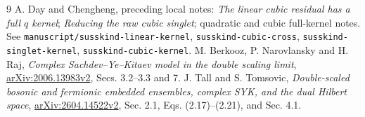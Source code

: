 \documentclass[11pt,a4paper]{article}
\begin{document}
\begin{thebibliography}{9}
 A. Day and Chengheng, preceding local notes:
\emph{The linear cubic residual has a full $q$ kernel};
\emph{Reducing the raw cubic singlet}; quadratic and cubic full-kernel
notes. See \texttt{manuscript/susskind-linear-kernel},
\texttt{susskind-cubic-cross}, \texttt{susskind-singlet-kernel},
\texttt{susskind-cubic-kernel}.
 M. Berkooz, P. Narovlansky and H. Raj,
\emph{Complex Sachdev--Ye--Kitaev model in the double scaling limit},
\href{https://arxiv.org/html/2006.13983v2}{arXiv:2006.13983v2},
Secs. 3.2--3.3 and 7.
 J. Tall and S. Tomsovic,
\emph{Double-scaled bosonic and fermionic embedded ensembles,
complex SYK, and the dual Hilbert space},
\href{https://arxiv.org/html/2604.14522v2}{arXiv:2604.14522v2},
Sec. 2.1, Eqs. (2.17)--(2.21), and Sec. 4.1.
\end{thebibliography}
\end{document}

